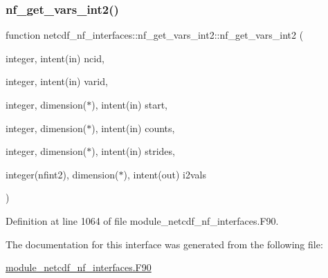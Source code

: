 \subsubsection{\texorpdfstring{nf\+\_\+get\+\_\+vars\+\_\+int2()}{nf\_get\_vars\_int2()}}
{\footnotesize\ttfamily function netcdf\+\_\+nf\+\_\+interfaces\+::nf\+\_\+get\+\_\+vars\+\_\+int2\+::nf\+\_\+get\+\_\+vars\+\_\+int2 (\begin{DoxyParamCaption}\item[{integer, intent(in)}]{ncid,  }\item[{integer, intent(in)}]{varid,  }\item[{integer, dimension($\ast$), intent(in)}]{start,  }\item[{integer, dimension($\ast$), intent(in)}]{counts,  }\item[{integer, dimension($\ast$), intent(in)}]{strides,  }\item[{integer(nfint2), dimension($\ast$), intent(out)}]{i2vals }\end{DoxyParamCaption})}



Definition at line 1064 of file module\+\_\+netcdf\+\_\+nf\+\_\+interfaces.\+F90.



The documentation for this interface was generated from the following file\+:\begin{DoxyCompactItemize}
\item 
\hyperlink{module__netcdf__nf__interfaces_8F90}{module\+\_\+netcdf\+\_\+nf\+\_\+interfaces.\+F90}\end{DoxyCompactItemize}
